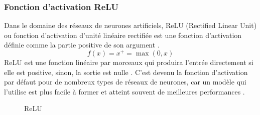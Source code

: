 	
	
	
	
	\subsubsection{Fonction d'activation ReLU}\label{subsec:relu}
	
	Dans le domaine des réseaux de neurones artificiels, ReLU (Rectified Linear Unit) ou fonction d'activation d'unité linéaire rectifiée est une fonction d'activation définie comme la partie positive de son argument \cite{goodfellow2016deep}.
	$${\displaystyle f(x)=x^{+}=\max(0,x)}$$
	ReLU est une fonction linéaire par morceaux qui produira l'entrée directement si elle est positive, sinon, la sortie est nulle \cite{tammina2019transfer}. C'est devenu la fonction d'activation par défaut pour de nombreux types de réseaux de neurones, car un modèle qui l'utilise est plus facile à former et atteint souvent de meilleures performances \cite{geron2017hands}.
	
	\begin{figure}
		\caption{ReLU}\label{fig:relu}
	\end{figure}
	
